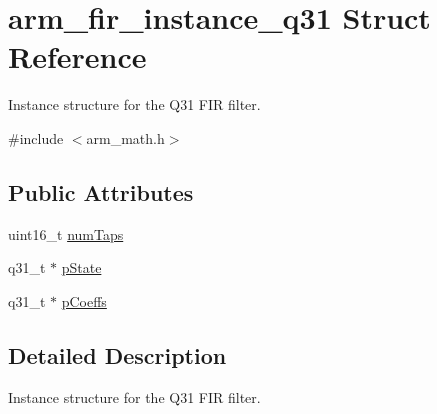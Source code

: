 \hypertarget{structarm__fir__instance__q31}{\section{arm\-\_\-fir\-\_\-instance\-\_\-q31 Struct Reference}
\label{structarm__fir__instance__q31}
}


Instance structure for the Q31 F\-I\-R filter.  




{\ttfamily \#include $<$arm\-\_\-math.\-h$>$}

\subsection*{Public Attributes}
\begin{DoxyCompactItemize}
\item 
uint16\-\_\-t \hyperlink{structarm__fir__instance__q31_a918fadd775b7a0482b21bf34dae2f094}{num\-Taps}
\item 
q31\-\_\-t $\ast$ \hyperlink{structarm__fir__instance__q31_a409f39c93b744784648bdc365541444d}{p\-State}
\item 
q31\-\_\-t $\ast$ \hyperlink{structarm__fir__instance__q31_afaae4c884bdf11a4ec2f3b9bb2bb51d0}{p\-Coeffs}
\end{DoxyCompactItemize}


\subsection{Detailed Description}
Instance structure for the Q31 F\-I\-R filter. 

